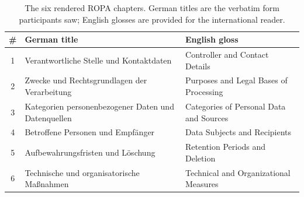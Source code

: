 \begin{table}[htbp]
\centering
\caption{The six rendered ROPA chapters. German titles are the
verbatim form participants saw; English glosses are provided for
the international reader.}
\label{tab:ropa-chapters}
\begin{tabularx}{\linewidth}{@{}c X X@{}}
\toprule
\# & German title & English gloss \\
\midrule
1 & Verantwortliche Stelle und Kontaktdaten             & Controller and Contact Details \\
2 & Zwecke und Rechtsgrundlagen der Verarbeitung        & Purposes and Legal Bases of Processing \\
3 & Kategorien personenbezogener Daten und Datenquellen & Categories of Personal Data and Sources \\
4 & Betroffene Personen und Empfänger                   & Data Subjects and Recipients \\
5 & Aufbewahrungsfristen und Löschung                   & Retention Periods and Deletion \\
6 & Technische und organisatorische Maßnahmen           & Technical and Organizational Measures \\
\bottomrule
\end{tabularx}
\end{table}

